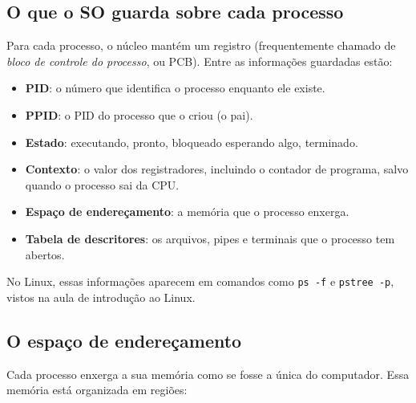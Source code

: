 \documentclass[11pt,a4paper]{article}
\newcommand{\cmd}[1]{\texttt{#1}}
\begin{document}
\subsection{O que o SO guarda sobre cada processo}

Para cada processo, o núcleo mantém um registro (frequentemente chamado de \emph{bloco de controle do processo}, ou PCB). Entre as informações guardadas estão:

\begin{itemize}
    \item \textbf{PID}: o número que identifica o processo enquanto ele existe.
    \item \textbf{PPID}: o PID do processo que o criou (o pai).
    \item \textbf{Estado}: executando, pronto, bloqueado esperando algo, terminado.
    \item \textbf{Contexto}: o valor dos registradores, incluindo o contador de programa, salvo quando o processo sai da CPU.
    \item \textbf{Espaço de endereçamento}: a memória que o processo enxerga.
    \item \textbf{Tabela de descritores}: os arquivos, pipes e terminais que o processo tem abertos.
\end{itemize}

No Linux, essas informações aparecem em comandos como \cmd{ps -f} e \cmd{pstree -p}, vistos na aula de introdução ao Linux.

\subsection{O espaço de endereçamento}

Cada processo enxerga a sua memória como se fosse a única do computador. Essa memória está organizada em regiões:

\begin{center}
\end{center}
\end{document}
